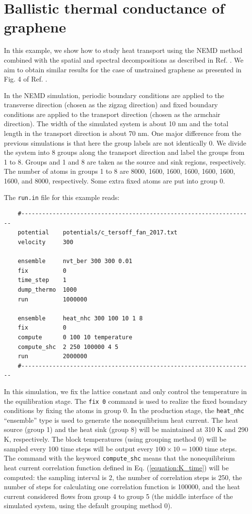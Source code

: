 \documentclass[12pt,a4paper]{report}
\begin{document}
\section{Ballistic thermal conductance of graphene}

In this example, we show how to study heat transport using the NEMD method combined with the spatial and spectral decompositions as described in Ref. \cite{fan2017prb}. We aim to obtain similar results for the case of unstrained graphene as presented in Fig. 4 of Ref. \cite{fan2017prb}.

In the NEMD simulation, periodic boundary conditions are applied to the transverse direction (chosen as the zigzag direction) and fixed boundary conditions are applied to the transport direction (chosen as the armchair direction). The width of the simulated system is about 10 nm and the total length in the transport direction is about 70 nm. One major difference from the previous simulations is that here the group labels are not identically 0. We divide the system into 8 groups along the transport direction and label the groups from 1 to 8. Groups and 1 and 8 are taken as the source and sink regions, respectively. The number of atoms in groups 1 to 8 are 8000, 1600, 1600, 1600, 1600, 1600, 1600, and 8000, respectively. Some extra fixed atoms are put into group 0. 

The \verb"run.in" file for this example reads:
\begin{verbatim}
    #-------------------------------------------------------------------
    potential    potentials/c_tersoff_fan_2017.txt
    velocity     300

    ensemble     nvt_ber 300 300 0.01
    fix          0
    time_step    1
    dump_thermo  1000
    run          1000000

    ensemble     heat_nhc 300 100 10 1 8
    fix          0
    compute      0 100 10 temperature
    compute_shc  2 250 100000 4 5
    run          2000000
    #-------------------------------------------------------------------
\end{verbatim}

In this simulation, we fix the lattice constant and only control the temperature in the equilibration stage. The \verb"fix 0" command is used to realize the fixed boundary conditions by fixing the atoms in group 0. In the production stage, the \verb"heat_nhc" ``ensemble'' type is used to generate the nonequilibrium heat current.  The heat source (group 1) and the heat sink (group 8) will be maintained at 310 K and 290 K, respectively. The block temperatures (using grouping method 0) will be sampled every 100 time steps will be output every $100\times 10=1000$ time steps. The command with the keyword \verb"compute_shc" means that the nonequilibrium heat current correlation function defined in Eq. (\ref{equation:K_time}) will be computed: the sampling interval is 2, the number of correlation steps is 250, the number of steps for calculating one correlation function is 100000, and the heat current considered flows from group 4 to group 5 (the middle interface of the simulated system, using the default grouping method 0).
\end{document}
